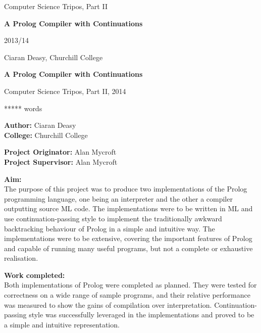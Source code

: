 \documentclass[12pt]{article}
\begin{document}
\thispagestyle{empty}

\medskip
{}
\medskip
{}

\vfil

\centerline{\large Computer Science Tripos, Part II}
\vspace{0.4in}
\centerline{\Large\bf A Prolog Compiler with Continuations}
\vspace{0.3in}
\centerline{\large 2013/14}
\vspace{2.5in}

\newpage
\hspace{5px}
\newpage

\vfil

\centerline{\large Ciaran Deasy, Churchill College}
\vspace{0.4in}
\centerline{\Large\bf A Prolog Compiler with Continuations}
\vspace{0.3in}
\centerline{\large Computer Science Tripos, Part II, 2014}
\vspace{0.1in}
\centerline{ ***** words} %
\vspace{0.25in}

{\bf Author:} Ciaran Deasy\\
{\bf College:} Churchill College

\vspace{0.25in}

{\bf Project Originator:} Alan Mycroft\\
{\bf Project Supervisor:} Alan Mycroft

\vspace{0.25in}

{\bf Aim:}\\
The purpose of this project was to produce two implementations of the Prolog programming language, one being an interpreter and the other a compiler outputting source ML code. 
The implementations were to be written in ML and use continuation-passing style to implement the traditionally awkward backtracking behaviour of Prolog in a simple and intuitive way. 
The implementations were to be extensive, covering the important features of Prolog and capable of running many useful programs, but not a complete or exhaustive realisation.

\vspace{0.20in}

{\bf Work completed:}\\
Both implementations of Prolog were completed as planned. 
They were tested for correctness on a wide range of sample programs, and their relative performance was measured to show the gains of compilation over interpretation. 
Continuation-passing style was successfully leveraged in the implementations and proved to be a simple and intuitive representation.
\end{document}

